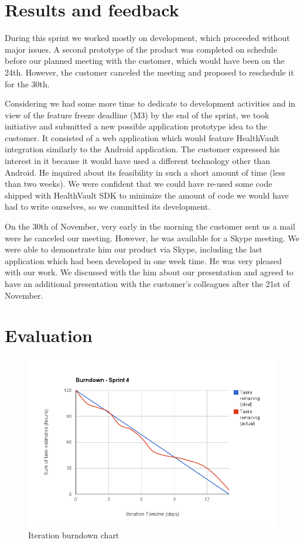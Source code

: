 \section{Results and feedback}

During this sprint we worked mostly on development, which proceeded without major issues.
A second prototype of the product was completed on schedule before our
planned meeting with the customer, which would have been on the 24th.
However, the customer canceled the meeting and proposed to reschedule it for the 30th.

Considering we had some more time to dedicate to development activities and in view
of the feature freeze deadline (M3) by the end of the sprint, we took initiative
and submitted a new possible application prototype idea to the customer.
It consisted of a web application which would feature HealthVault integration
similarly to the Android application.
The customer expressed his interest in it because it would have used a different
technology other than Android. He inquired about its feasibility in such a short amount
of time (less than two weeks). We were confident that we could have re-used some code
shipped with HealthVault SDK to minimize the amount of code we would have had to write
ourselves, so we committed its development.

On the 30th of November, very early in the morning the customer sent us a mail
were he canceled our meeting. However, he was available for a Skype meeting.
We were able to demonstrate him our product via Skype, including the last application
which had been developed in one week time. He was very pleased with our work.
We discussed with the him about our presentation and agreed to have an additional
presentation with the customer's colleagues after the 21st of November.

\section{Evaluation}

\begin{figure}
\centering
\includegraphics[scale=0.60]{../Figures/burndownSprint4.png}
\caption{Iteration burndown chart}
\label{figure:burndownsprint4}
\end{figure}

